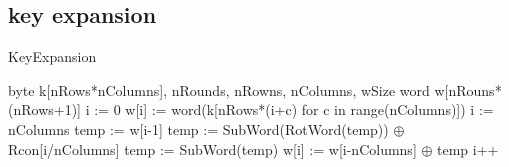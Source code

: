\documentclass[a4paper,twoside]{llncs}
\begin{document}
\subsection{key expansion}

\begin{algorithm}
 \caption{KeyExpansion}
 \label{alg:keyExpansion}
 \begin{algorithmic}[1]
  \REQUIRE byte k[nRows*nColumns], nRounds, nRowns, nColumns, wSize
  \ENSURE word w[nRouns*(nRows+1)]
  \STATE i := 0
    \STATE w[i] := word(k[nRows*(i+c) for c in range(nColumns)])
  \ENDWHILE
  \STATE i := nColumns
    \STATE temp := w[i-1]
      \STATE temp := SubWord(RotWord(temp)) $\oplus$ Rcon[i/nColumns]
    \ELSE
      \STATE temp := SubWord(temp)
    \ENDIF
    \STATE w[i] := w[i-nColumns] $\oplus$ temp
    \STATE i++
  \ENDWHILE
 \end{algorithmic}
\end{algorithm}

\end{document}

